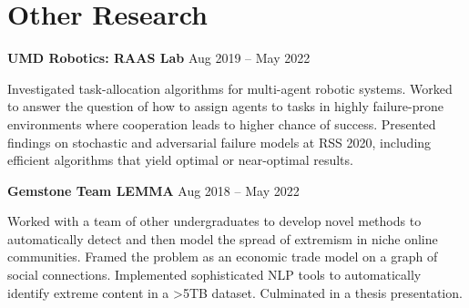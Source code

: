 \documentclass[letterpaper,11pt]{article}
\begin{document}
\section{Other Research}
\hspace{8pt}
\begin{minipage}[t]{0.46\textwidth}
    \textbf{UMD Robotics: RAAS Lab} \hspace{\fill} Aug 2019 -- May 2022
    
    \setlength{\parindent}{15pt}
    {\small Investigated task-allocation algorithms for multi-agent robotic systems. Worked to answer the question of how to assign agents to tasks in highly failure-prone environments where cooperation leads to higher chance of success. Presented findings on stochastic and adversarial failure models at RSS 2020, including efficient algorithms that yield optimal or near-optimal results.}
\end{minipage}
\hfill
\begin{minipage}[t]{0.46\textwidth}
    \textbf{Gemstone Team LEMMA} \hspace{\fill} Aug 2018 -- May 2022
    
    \setlength{\parindent}{15pt}
    {\small Worked with a team of other undergraduates to develop novel methods to automatically detect and then model the spread of extremism in niche online communities. Framed the problem as an economic trade model on a graph of social connections. Implemented sophisticated NLP tools to automatically identify extreme content in a >5TB dataset. Culminated in a thesis presentation.}
\end{minipage}
\hspace{8pt}
\end{document}
